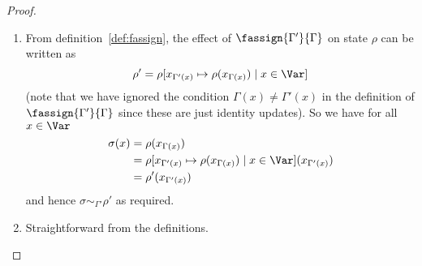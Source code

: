 \documentclass{sigplanconf}
\begin{document}
\begin{proof}
  \begin{enumerate}
  \item
From  definition~\ref{def:fassign}, the effect of $\fassign{\Gamma'}{\Gamma}$ on state $\rho$ 
can be written as 
\[
\rho' = \rho[x_{\Gamma'(x)} \mapsto \rho(x_{\Gamma(x)} ) \mid x \in \Var]
\]
(note that we have ignored the condition $\Gamma(x) \neq \Gamma'(x)$
in the definition of $\fassign{\Gamma'}{\Gamma}$ since these are just identity updates).
So we have for all $x \in \Var$
\begin{align*}
\sigma(x) &= \rho(x_{\Gamma(x)}) \\
          &= \rho[x_{\Gamma'(x)} \mapsto \rho(x_{\Gamma(x)} ) \mid x \in \Var](x_{\Gamma'(x)})\\
          &= \rho'(x_{\Gamma'(x)}) 
\end{align*}
and hence $\sigma \sim_{\Gamma'} \rho'$ as required.
\item
Straightforward from the definitions.
  \end{enumerate}
\end{proof}
\end{document}
